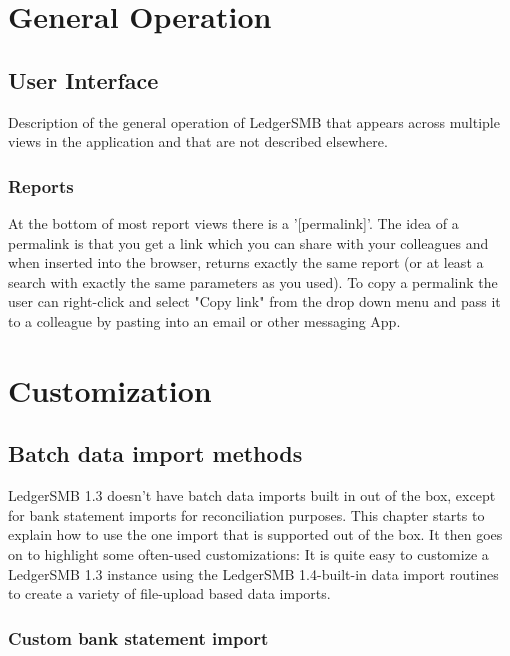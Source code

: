 
\part{General Operation}
\label{part-general-operation}

\chapter{User Interface}
\label{cha-general-operation-user-interfacei}
Description of the general operation of LedgerSMB that appears across multiple views in the application and that are not described elsewhere.

\section{Reports}
\label{sec-general-operation-user-interface-reports}

At the bottom of most report views there is a '[permalink]'. The idea of a \gls{permalink} is that you get a link which you can share with your colleagues and when inserted into the browser, returns exactly the same report (or at least a search with exactly the same parameters as you used).  To copy a  \gls{permalink} the user can right-click and select "Copy link" from the drop down menu and pass it to a colleague by pasting into an email or other messaging App.

\part{Customization}
\label{part-customization}

\chapter{Batch data import methods}
\label{cha-customization-batch-import}

LedgerSMB 1.3 doesn't have batch data imports built in out of the box,
except for bank statement imports for reconciliation purposes. This
chapter starts to explain how to use the one import that is supported
out of the box. It then goes on to highlight some often-used customizations: 
It is quite easy to customize a LedgerSMB 1.3 instance using
the LedgerSMB 1.4-built-in data import routines to create a variety
of file-upload based data imports.

\section{Custom bank statement import}
\label{sec-customization-batch-import-bank-statement}

